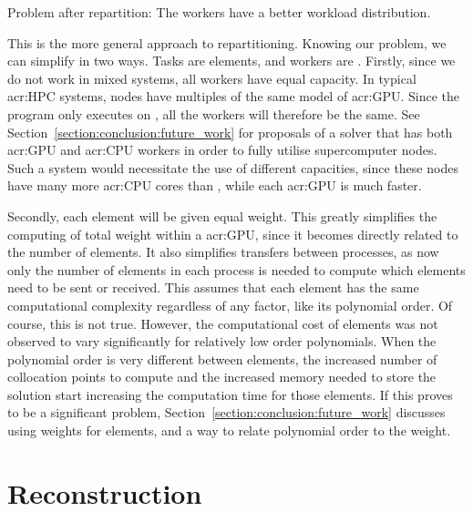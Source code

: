 \begin{table}[H]
\begin{center}
        \caption{Problem after repartition: The workers have a better workload distribution.}\label{table:after_repartition}
    \end{center}
\end{table}

This is the more general approach to repartitioning. Knowing our problem, we can simplify in two
ways. Tasks are elements, and workers are . Firstly, since we do not work in
mixed systems, all workers have equal capacity. In typical \acrshort{acr:HPC} systems, nodes have
multiples of the same model of \acrshort{acr:GPU}. Since the program only executes on
, all the workers will therefore be the same. See
Section~\ref{section:conclusion:future_work} for proposals of a solver that has both
\acrshort{acr:GPU} and \acrshort{acr:CPU} workers in order to fully utilise supercomputer nodes.
Such a system would necessitate the use of different capacities, since these nodes have many more
\acrshort{acr:CPU} cores than , while each \acrshort{acr:GPU} is much faster. 

Secondly, each element will be given equal weight. This greatly simplifies the computing of total
weight within a \acrshort{acr:GPU}, since it becomes  directly related to the number of elements. It
also simplifies transfers between processes, as now only the number of elements in each process is
needed to compute which elements need to be sent or received. This assumes that each element has the
same computational complexity regardless of any factor, like its polynomial order. Of course, this
is not true. However, the computational cost of elements was not observed to vary significantly for
relatively low order polynomials. When the polynomial order is very different between elements, the
increased number of collocation points to compute and the increased memory needed to store the
solution start increasing the computation time for those elements. If this proves to be a
significant problem, Section~\ref{section:conclusion:future_work} discusses using weights for
elements, and a way to relate polynomial order to the weight. 

\section{Reconstruction}\label{section:load_balancing:reconstruction}

